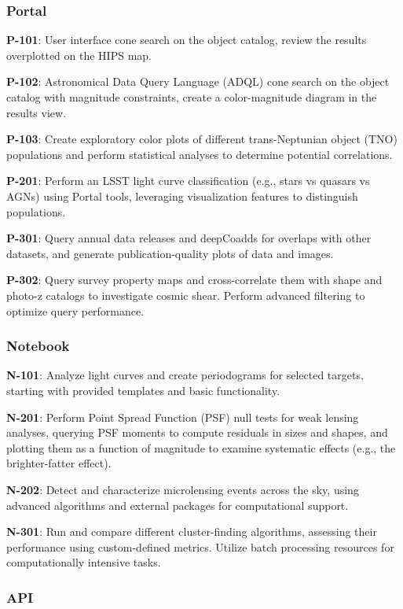 
\subsubsection{Portal}

\textbf{P-101}: User interface cone search on the object catalog, review the results overplotted on the HIPS map.

\textbf{P-102}: Astronomical Data Query Language (ADQL) cone search on the object catalog with magnitude constraints, create a color-magnitude diagram in the results view.

\textbf{P-103}: Create exploratory color plots of different trans-Neptunian object (TNO) populations and perform statistical analyses to determine potential correlations. 

\textbf{P-201}: Perform an LSST light curve classification (e.g., stars vs quasars vs AGNs) using Portal tools, leveraging visualization features to distinguish populations.

\textbf{P-301}: Query annual data releases and deepCoadds for overlaps with other datasets, and generate publication-quality plots of data and images.

\textbf{P-302}: Query survey property maps and cross-correlate them with shape and photo-z catalogs to investigate cosmic shear. Perform advanced filtering to optimize query performance.

\subsubsection{Notebook}

\textbf{N-101}:  Analyze light curves and create periodograms for selected targets, starting with provided templates and basic functionality.

\textbf{N-201}: Perform Point Spread Function (PSF) null tests for weak lensing analyses, querying PSF moments to compute residuals in sizes and shapes, and plotting them as a function of magnitude to examine systematic effects (e.g., the brighter-fatter effect).

\textbf{N-202}: Detect and characterize microlensing events across the sky, using advanced algorithms and external packages for computational support.

\textbf{N-301}: Run and compare different cluster-finding algorithms, assessing their performance using custom-defined metrics. Utilize batch processing resources for computationally intensive tasks.

\subsubsection{API}

